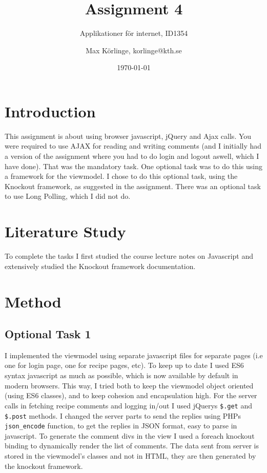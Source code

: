 \documentclass[a4paper]{scrreprt}
\title{Assignment 4}
\subtitle{Applikationer för internet, ID1354}
\author{Max Körlinge, korlinge@kth.se}
\date{\today}
\newcommand{\code}[1]{\texttt{#1}}
\begin{document}
\maketitle

\tableofcontents %
\clearpage

\chapter{Introduction}

This assignment is about using browser javascript, jQuery and Ajax calls. You were required to use AJAX for reading and writing comments (and I initially had a version of the assignment where you had to do login and logout aswell, which I have done). That was the mandatory task. One optional task was to do this using a framework for the viewmodel. I chose to do this optional task, using the Knockout framework, as suggested in the assignment. There was an optional task to use Long Polling, which I did not do.

\chapter{Literature Study}

To complete the tasks I first studied the course lecture notes on Javascript and extensively studied the Knockout framework documentation.

\chapter{Method}

\section{Optional Task 1}

I implemented the viewmodel using separate javascript files for separate pages (i.e one for login page, one for recipe pages, etc). To keep up to date I used ES6 syntax javascript as much as possible, which is now available by default in modern browsers. This way, I tried both to keep the viewmodel object oriented (using ES6 classes), and to keep cohesion and encapsulation high.
For the server calls in fetching recipe comments and logging in/out I used jQuerys \code{\$.get} and \code{\$.post} methods. I changed the server parts to send the replies using PHPs \code{json\_encode} function, to get the replies in JSON format, easy to parse in javascript. To generate the comment divs in the view I used a foreach knockout binding to dynamically render the list of comments. The data sent from server is stored in the viewmodel's classes and not in HTML, they are then generated by the knockout framework.
\end{document}
